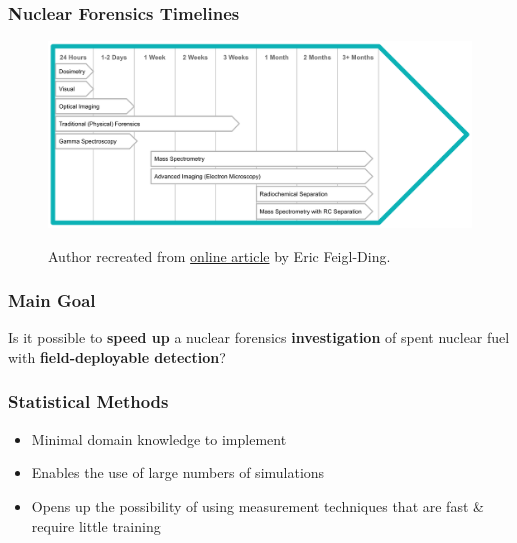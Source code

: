 \begin{frame}
  \frametitle{Nuclear Forensics Timelines}
  \begin{adjustwidth}{-10pt}{-15pt}
  \begin{figure}
    \centering
    \includegraphics[width=1.1\textwidth]{./figures/nf_timeline.png}
    \\ \raggedright \scriptsize Author recreated from 
    \href{https://fas.org/pir-pubs/the-false-hope-of-nuclear-forensics-assessing-the-timeliness-of-forensics-intelligence/}{\color{blue}online
    article} by Eric Feigl-Ding.
  \end{figure}
  \end{adjustwidth}
\end{frame}

\begin{frame}
  \frametitle{Main Goal}

  Is it possible to \textbf{speed up} a nuclear forensics
  \textbf{investigation} of spent nuclear fuel with \textbf{field-deployable
  detection}?

\end{frame}

\begin{frame}
  \frametitle{Statistical Methods}
  \begin{itemize}
    \item Minimal domain knowledge to implement
    \item Enables the use of large numbers of simulations
    \item Opens up the possibility of using measurement techniques that are fast \& require little training
  \end{itemize}
\end{frame}

